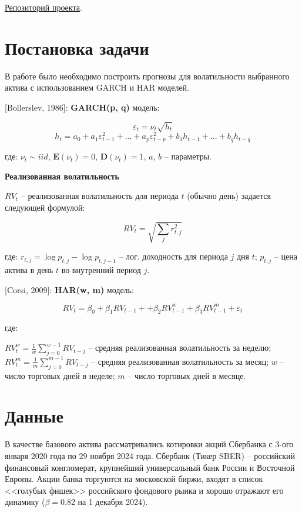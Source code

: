\documentclass[]{article}
\begin{document}
{
	\Large
	\href{https://github.com/MaximKiryakin/Vega/tree/FinanceEconometrics/Project2}{Репозиторий проекта}.
}

\section{Постановка задачи}


В работе было необходимо построить прогнозы для волатильности выбранного актива с использованием GARCH и HAR моделей. 

[Bollerslev, 1986]: \textbf{GARCH(p, q)} модель:

$$\varepsilon_t = \nu_t \sqrt{h_t}$$
$$h_t = a_0 + a_1\varepsilon_{t-1}^2 + ... + a_p\varepsilon_{t-p}^2 + b_1 h_{t-1} + ... + b_q h_{t-q}$$

где: $\nu_t \sim iid$, $\mathbf{E}(\nu_t) = 0$, $\mathbf{D}(\nu_t) = 1$, $a$, $b$ -- параметры.

\textbf{Реализованная волатильность}

$RV_t$ -- реализованная волатильность для периода $t$ (обычно день) задается следующей формулой:

$$RV_{t} = \sqrt{\sum_{j}r_{t, j}^2}$$


где: $r_{t, j} = \log{p_{t, j}} - \log{p_{t, j-1}}$ -- лог. доходность для периода $j$ дня $t$; $p_{t, j}$ -- цена актива в день $t$ во внутренний период $j$.


[Corsi, 2009]: \textbf{HAR(w, m)} модель: 

$$RV_t = \beta_0 + \beta_1 RV_{t-1} ++ \beta_2 RV_{t-1}^w + \beta_3 RV_{t-1}^m + \varepsilon_t$$

где: 

$RV_{t}^w = \frac{1}{w}\sum_{j=0}^{w-1}RV_{t-j}$ -- средняя реализованная волатильность за неделю; 
$RV_{t}^m = \frac{1}{m}\sum_{j=0}^{m-1}RV_{t-j}$ -- средняя реализованная волатильность за месяц; $w$ -- число торговых дней в неделе; $m$ -- число торговых дней в месяце.



\section{Данные}


В качестве базового актива рассматривались котировки акций Сбербанка с 3-ого января 2020 года по 29 ноября 2024 года.  Сбербанк (Тикер SBER) -- российский финансовый конгломерат, крупнейший универсальный банк России и Восточной Европы. Акции банка торгуются на московской биржи, входят в список <<голубых фишек>> российского фондового рынка и хорошо отражают его динамику ($\beta = 0.82$ на 1 декабря 2024).
\end{document}
